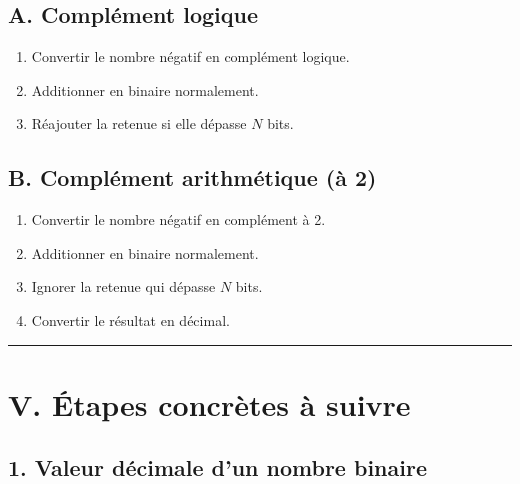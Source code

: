 \documentclass[a4paper,12pt]{article}
\begin{document}
  

\subsection*{A. Complément logique} 

\begin{enumerate} 

    \item Convertir le nombre négatif en complément logique. 

    \item Additionner en binaire normalement. 

    \item Réajouter la retenue si elle dépasse $N$ bits. 

\end{enumerate} 

  

\subsection*{B. Complément arithmétique (à 2)} 

\begin{enumerate} 

    \item Convertir le nombre négatif en complément à 2. 

    \item Additionner en binaire normalement. 

    \item Ignorer la retenue qui dépasse $N$ bits. 

    \item Convertir le résultat en décimal. 

\end{enumerate} 

  

\hrule
\section*{V. Étapes concrètes à suivre} 

  

\subsection*{1. Valeur décimale d’un nombre binaire} 
\end{document}
